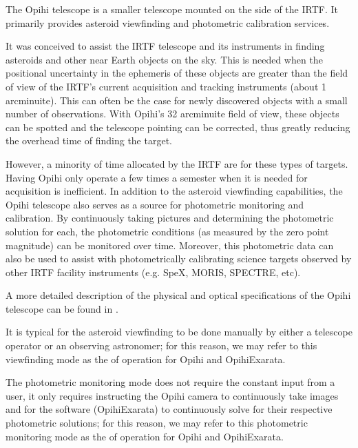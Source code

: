 \documentclass[letterpaper,11pt,english]{sphinxmanual}
\begin{document}
\sphinxAtStartPar
The Opihi telescope is a smaller telescope mounted on the side of the IRTF. It
primarily provides asteroid view\sphinxhyphen{}finding and photometric calibration services.

\sphinxAtStartPar
It was conceived to assist the IRTF telescope and its instruments in finding
asteroids and other near Earth objects on the sky. This is needed when the
positional uncertainty in the ephemeris of these objects are greater than the
field of view of the IRTF’s current acquisition and tracking instruments
(about 1 arcminuite). This can often be the case for newly discovered objects
with a small number of observations. With Opihi’s 32 arcminuite field of view,
these objects can be spotted and the telescope pointing can be corrected, thus
greatly reducing the overhead time of finding the target.

\sphinxAtStartPar
However, a minority of time allocated by the IRTF are for these types of
targets. Having Opihi only operate a few times a semester when it is needed
for acquisition is inefficient. In addition to the asteroid view\sphinxhyphen{}finding
capabilities, the Opihi telescope also serves as a source for photometric
monitoring and calibration. By continuously taking pictures and determining the
photometric solution for each, the photometric conditions (as measured by
the zero point magnitude) can be monitored over time. Moreover, this
photometric data can also be used to assist with photometrically calibrating
science targets observed by other IRTF facility instruments (e.g. SpeX, MORIS,
SPECTRE, etc).

\sphinxAtStartPar
A more detailed description of the physical and optical specifications of the
Opihi telescope can be found in {\hyperref[\detokenize{user/opihi_telescope:user-opihi-telescope}]{}}.

\sphinxAtStartPar
It is typical for the asteroid view\sphinxhyphen{}finding to be done manually by either a
telescope operator or an observing astronomer; for this reason, we may refer
to this view\sphinxhyphen{}finding mode as the {\hyperref[\detokenize{user/manual_mode:user-manual-mode}]{}} of operation for
Opihi and OpihiExarata.

\sphinxAtStartPar
The photometric monitoring mode does not require the constant
input from a user, it only requires instructing the Opihi camera to
continuously take images and for the software (OpihiExarata) to continuously
solve for their respective photometric solutions; for this reason, we may
refer to this photometric monitoring mode as the {\hyperref[\detokenize{user/automatic_mode:user-automatic-mode}]{}}
of operation for Opihi and OpihiExarata.
\end{document}
